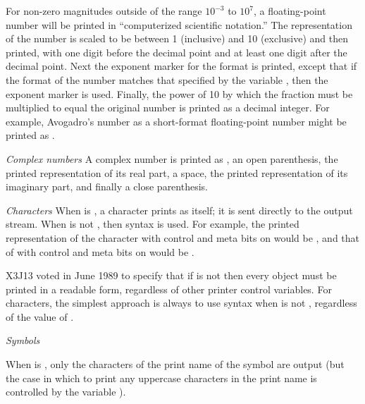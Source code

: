 \begin{flushdesc}
For non-zero magnitudes
outside of the range $10^{-3}$
to $10^7$, a floating-point number
will be printed in ``computerized scientific
notation.''  The representation of the number is scaled to be between
1 (inclusive) and 10 (exclusive) and then printed, with one digit
before the decimal point and at least one digit after the decimal point.
Next the exponent marker for the format is printed,
except that
if the format of the number matches that specified by the variable
, then the exponent marker 
is used.
Finally, the power of 10 by which the fraction must be multiplied
to equal the original number is printed as a decimal integer.
For example, Avogadro's number as a short-format floating-point number
might be printed as .

\item[\emph{Complex numbers}]
A complex number is printed as ,
an open parenthesis,
the printed representation of its real part, a space,
the printed representation of its imaginary part, and finally
a close parenthesis.


\begin{obsolete}
\item[\emph{Characters}]
When  is {\false}, a character prints as itself;
it is sent directly to the output stream.
When  is not {\false}, then \cd{\#{\Xbackslash}} syntax is used.
For example, the
printed representation of the character  with control and meta
bits on would be , and that of  with
control and meta bits on would be .
\end{obsolete}
\begin{newer}
X3J13 voted in June 1989  to specify that if 
is not {\false} then every object must be printed in a readable form,
regardless of other printer control variables.  For characters, the simplest approach
is always to use \cd{\#{\Xbackslash}} syntax when 
is not {\false}, regardless of the value of .
\end{newer}


\begin{obsolete}
\item[\emph{Symbols}]

When  is {\false}, only the characters of the print name
of the symbol are output (but the case in which to print any
uppercase characters in the print name is controlled by the
variable ).
\end{obsolete}


\end{flushdesc}
